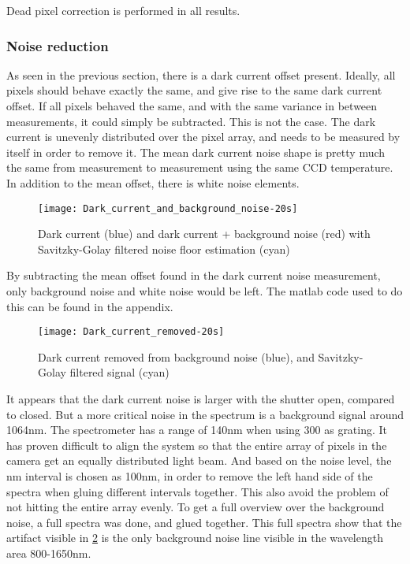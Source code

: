 Dead pixel correction is performed in all results.

\subsubsection{Noise reduction}

As seen in the previous section, there is a dark current offset present. Ideally, all pixels should behave exactly the same, and give rise to the same dark current offset. If all pixels behaved the same, and with the same variance in between measurements, it could simply be subtracted. This is not the case. The dark current is unevenly distributed over the pixel array, and needs to be measured by itself in order to remove it. The mean dark current noise shape is pretty much the same from measurement to measurement using the same CCD temperature. In addition to the mean offset, there is white noise elements. 

\begin{figure}[H]
\centering
\texttt{[image: Dark\_current\_and\_background\_noise-20s]}
\caption[Dark current and noise]{Dark current (blue) and dark current + background noise (red) with Savitzky-Golay filtered noise floor estimation (cyan)}%
\label{fig:dark_current_and_background_noise}%
\end{figure}

By subtracting the mean offset found in the dark current noise measurement, only background noise and white noise would be left. The matlab code used to do this can be found in the appendix.

\begin{figure}[H]
\centering
\texttt{[image: Dark\_current\_removed-20s]}
\caption[Dark current removed]{Dark current removed from background noise (blue), and Savitzky-Golay filtered signal (cyan)}%
\label{fig:dark_current_removed-20s}%
\end{figure}

It appears that the dark current noise is larger with the shutter open, compared to closed. But a more critical noise in the spectrum is a background signal around 1064nm. The spectrometer has a range of 140nm when using 300 as grating. It has proven difficult to align the system so that the entire array of pixels in the camera get an equally distributed light beam. And based on the noise level, the nm interval is chosen as 100nm, in order to remove the left hand side of the spectra when gluing different intervals together. This also avoid the problem of not hitting the entire array evenly. To get a full overview over the background noise, a full spectra was done, and glued together. This full spectra show that the artifact visible in \ref{fig:dark_current_removed-20s} is the only background noise line visible in the wavelength area 800-1650nm.

